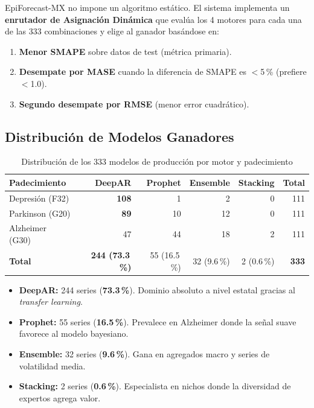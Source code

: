 \documentclass[12pt, letterpaper]{article}
\begin{document}
EpiForecast-MX no impone un algoritmo estático. El sistema implementa un \textbf{enrutador de Asignación Dinámica} que evalúa los 4 motores para cada una de las 333 combinaciones y elige al ganador basándose en:

\begin{enumerate}[noitemsep]
    \item \textbf{Menor SMAPE} sobre datos de test (métrica primaria).
    \item \textbf{Desempate por MASE} cuando la diferencia de SMAPE es $<$5\,\% (prefiere $<$1.0).
    \item \textbf{Segundo desempate por RMSE} (menor error cuadrático).
\end{enumerate}

\subsection{Distribución de Modelos Ganadores}

\begin{table}[H]
\centering
\caption{Distribución de los 333 modelos de producción por motor y padecimiento}
\label{tab:dist_prod}
\small
\begin{tabular}{l rrrr r}
\toprule
\textbf{Padecimiento} & \textbf{DeepAR} & \textbf{Prophet} & \textbf{Ensemble} & \textbf{Stacking} & \textbf{Total} \\
\midrule
\rowcolor{cdeepar!8}
Depresión (F32)  & \textbf{108} & 1  & 2  & 0 & 111 \\
Parkinson (G20)  & \textbf{89}  & 10 & 12 & 0 & 111 \\
Alzheimer (G30)  & 47           & 44 & 18 & 2 & 111 \\
\midrule
\textbf{Total}   & \textbf{244 (73.3\,\%)} & 55 (16.5\,\%) & 32 (9.6\,\%) & 2 (0.6\,\%) & \textbf{333} \\
\bottomrule
\end{tabular}
\end{table}

\begin{itemize}[noitemsep]
    \item \textcolor{cdeepar}{\textbf{DeepAR:}} 244 series (\textbf{73.3\,\%}). Dominio absoluto a nivel estatal gracias al \textit{transfer learning}.
    \item \textcolor{cprophet}{\textbf{Prophet:}} 55 series (\textbf{16.5\,\%}). Prevalece en Alzheimer donde la señal suave favorece al modelo bayesiano.
    \item \textcolor{censemble}{\textbf{Ensemble:}} 32 series (\textbf{9.6\,\%}). Gana en agregados macro y series de volatilidad media.
    \item \textcolor{cstacking}{\textbf{Stacking:}} 2 series (\textbf{0.6\,\%}). Especialista en nichos donde la diversidad de expertos agrega valor.
\end{itemize}
\end{document}

